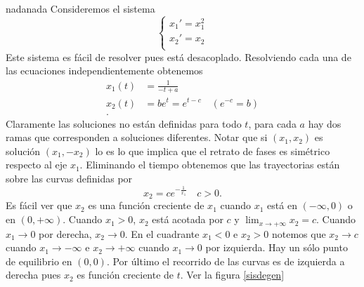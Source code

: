 \begin{ejemplo}{nadanada} Consideremos el sistema
\begin{equation}\label{nada}
\left\{%
\begin{array}{l}
    x_1'=x_1^2 \\
    x_2'=x_2 \\
\end{array}%
\right.
\end{equation}
Este sistema es fácil de resolver pues está desacoplado.
Resolviendo cada una de las ecuaciones independientemente
obtenemos
\[
    \begin{split}
    x_1(t)&=\frac{1}{-t+a}\\
    x_2(t)&=be^t=e^{t-c}\quad (e^{-c}=b)\\ .
    \end{split}
\]
Claramente las soluciones no están definidas para todo $t$, para
cada $a$ hay dos ramas que corresponden a soluciones diferentes.
Notar que si $(x_1,x_2)$ es solución $(x_1,-x_2)$ lo es lo que
implica que el retrato de fases es simétrico respecto al eje
$x_1$. Eliminando el tiempo obtenemos que las trayectorias están
sobre las curvas definidas por
\[
    x_2=ce^{-\frac1{x_1}}\quad c>0.
\]
Es fácil ver que $x_2$ es una función creciente de $x_1$ cuando
$x_1$ está en $(-\infty,0)$ o en $(0,+\infty)$. Cuando $x_1>0$,
$x_2$ está acotada por $c$ y $\lim_{x\to+\infty}x_2=c$. Cuando
$x_1\to 0$ por derecha, $x_2\to 0$. En el cuadrante $x_1<0$ e
$x_2>0$ notemos que $x_2\to c$ cuando $x_1\to -\infty$ e
$x_2\to+\infty$ cuando $x_1\to 0$ por izquierda. Hay un sólo punto
de equilibrio en $(0,0)$. Por último el recorrido de las curvas es
de izquierda a derecha pues $x_2$ es función creciente de $t$. Ver
la figura \ref{sisdegen}
\begin{figure}[h]


\end{figure}
\end{ejemplo}
